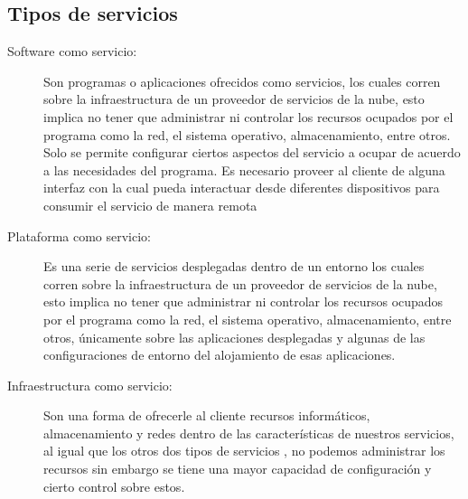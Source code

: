     \subsection{Tipos de servicios}
        \begin{description}
            \item[Software como servicio:]
            Son programas o aplicaciones ofrecidos como servicios, los cuales corren sobre la infraestructura de un proveedor de servicios de la nube, esto implica no tener que administrar ni controlar los recursos ocupados por el programa como la red, el sistema operativo, almacenamiento, entre otros. Solo se permite configurar ciertos aspectos del servicio a ocupar de acuerdo a las necesidades del programa. Es necesario proveer al cliente de alguna interfaz con la cual pueda interactuar desde diferentes dispositivos para consumir el servicio de manera remota
            

            \item[Plataforma como servicio:] Es una serie de servicios desplegadas dentro de un entorno los cuales corren sobre la infraestructura de un proveedor de servicios de la nube, esto implica no tener que administrar ni controlar los recursos ocupados por el programa como la red, el sistema operativo, almacenamiento, entre otros, únicamente sobre las aplicaciones desplegadas y algunas de las configuraciones de entorno del alojamiento de esas aplicaciones.
            
            \item[Infraestructura como servicio:] Son una forma de ofrecerle al cliente recursos informáticos, almacenamiento y redes dentro de las características de nuestros servicios, al igual que los otros dos tipos de servicios , no podemos administrar los recursos sin embargo se tiene una mayor capacidad de configuración y cierto control sobre estos.
        \end{description}


    
    
    
    
